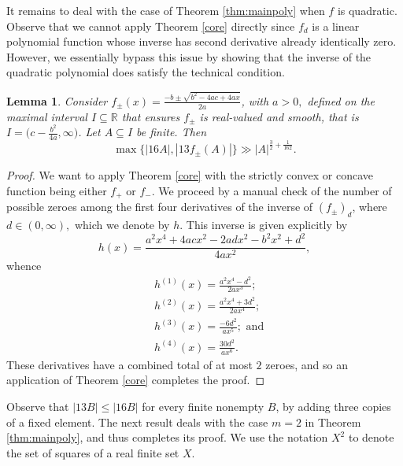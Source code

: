 \documentclass[11pt]{amsart}
\newcommand{\R}{\mathbb{R}}
\newtheorem{lemma}[theorem]{Lemma}
\begin{document}
It remains to deal with the case of Theorem \ref{thm:mainpoly} when $f$ is quadratic. Observe that we cannot apply Theorem \ref{core} directly since $f_d$ is a linear polynomial function whose inverse has second derivative already identically zero. However, we essentially bypass this issue by showing that the inverse of the quadratic polynomial does satisfy the technical condition.
\begin{lemma}\label{inversequad}
    Consider $f_\pm(x)=\frac{-b\pm\sqrt{b^2-4ac+4ax}}{2a}$, with $a>0,$ defined on the maximal interval $I\subseteq\R$ that ensures $f_{\pm}$ is real-valued and smooth, that is $I=\Big(c-\frac{b^2}{4a},\infty\Big)$.
    Let $A\subseteq I$ be finite. Then
\[
    \max \{|16A|, |13f_\pm(A)| \} \gg |A|^{\frac{3}{2} +\frac{1}{162}}.
    \]
\end{lemma}
\begin{proof}
    We want to apply Theorem \ref{core} with the strictly convex or concave function being either $f_+$ or $f_-$. We proceed by a manual check of the number of possible zeroes among the first four derivatives of the inverse of $(f_\pm)_d$, where $d\in(0,\infty),$ which we denote by $h$. This inverse is given explicitly by\begin{equation*}
        h(x)=\frac{a^2x^4+4acx^2-2adx^2-b^2x^2+d^2}{4ax^2},
    \end{equation*}whence\begin{equation*}
        \begin{split}
            &h^{(1)}(x)=\frac{a^2x^4-d^2}{2ax^3};\\
            &h^{(2)}(x)=\frac{a^2x^4+3d^2}{2ax^4};\\
            &h^{(3)}(x)=\frac{-6d^2}{ax^5};\text{ and}\\
            &h^{(4)}(x)=\frac{30d^2}{ax^6}.
        \end{split}
    \end{equation*}
    These derivatives have a combined total of at most $2$ zeroes, and so an application of Theorem \ref{core} completes the proof. %
\end{proof}
Observe that $|13B|\le|16B|$ for every finite nonempty $B$, by adding three copies of a fixed element. The next result deals with the case $m=2$ in Theorem \ref{thm:mainpoly}, and thus completes its proof. We use the notation $X^2$ to denote the set of squares of a real finite set $X.$
\end{document}
